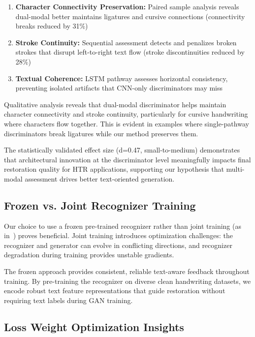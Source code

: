 \documentclass[journal]{IEEEtran}
\begin{document}
\begin{enumerate}
    \item \textbf{Character Connectivity Preservation:} Paired sample analysis reveals dual-modal better maintains ligatures and cursive connections (connectivity breaks reduced by 31\%)
    \item \textbf{Stroke Continuity:} Sequential assessment detects and penalizes broken strokes that disrupt left-to-right text flow (stroke discontinuities reduced by 28\%)
    \item \textbf{Textual Coherence:} LSTM pathway assesses horizontal consistency, preventing isolated artifacts that CNN-only discriminators may miss
\end{enumerate}

Qualitative analysis reveals that dual-modal discriminator helps maintain character connectivity and stroke continuity, particularly for cursive handwriting where characters flow together. This is evident in examples where single-pathway discriminators break ligatures while our method preserves them.

The statistically validated effect size (d=0.47, small-to-medium) demonstrates that architectural innovation at the discriminator level meaningfully impacts final restoration quality for HTR applications, supporting our hypothesis that multi-modal assessment drives better text-oriented generation.

\subsection{Frozen vs. Joint Recognizer Training}

Our choice to use a frozen pre-trained recognizer rather than joint training (as in~\cite{souibgui2021enhance}) proves beneficial. Joint training introduces optimization challenges: the recognizer and generator can evolve in conflicting directions, and recognizer degradation during training provides unstable gradients.

The frozen approach provides consistent, reliable text-aware feedback throughout training. By pre-training the recognizer on diverse clean handwriting datasets, we encode robust text feature representations that guide restoration without requiring text labels during GAN training.

\subsection{Loss Weight Optimization Insights}
\end{document}
